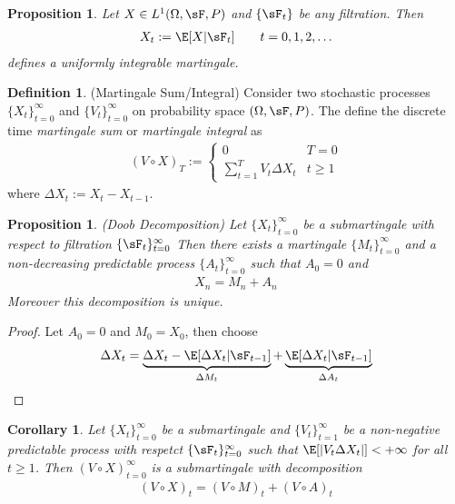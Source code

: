 \documentclass[12pt]{article}
\theoremstyle{plain}
\newtheorem{prop}[thm]{Proposition}
\newtheorem{cor}[thm]{Corollary}
\theoremstyle{definition}
\newtheorem{defn}[thm]{Definition}
\theoremstyle{remark}
\newcommand{\sumtT}{\sum^T_{t=1}}
\newcommand{\tinf}{_{t=1}^\infty}
\newcommand{\tinfz}{_{t=0}^\infty}
\begin{document}
\begin{prop}
Let $X\in L^1(\Omega,\sF,P)$ and $\{\sF_t\}$ be any filtration. Then
\begin{align*}
  X_t := \E[X|\sF_t] \qquad t=0,1,2,\ldots
\end{align*}
defines a uniformly integrable martingale.
\end{prop}


\begin{defn}(Martingale Sum/Integral)
\label{defn:martingalesum}
Consider two stochastic processes $\{X_t\}\tinfz$ and $\{V_t\}\tinfz$ on
probability space $(\Omega,\sF,P)$. The define the discrete time
\emph{martingale sum} or \emph{martingale integral} as
\begin{align*}
  (V\circ X)_T
  :=
  \begin{cases}
    0 & T = 0 \\
    \sumtT V_t \Delta X_t & t \geq 1
  \end{cases}
\end{align*}
where $\Delta X_t:= X_t - X_{t-1}$.
\end{defn}

\begin{prop}\emph{(Doob Decomposition)}
Let $\{X_t\}\tinfz$ be a submartingale with respect to filtration
$\{\sF_t\}\tinfz$ Then there exists a martingale $\{M_t\}\tinfz$ and a
non-decreasing predictable process $\{A_t\}\tinfz$ such that $A_0=0$ and
\begin{align*}
  X_n = M_n + A_n
\end{align*}
Moreover this decomposition is unique.
\end{prop}
\begin{proof}
Let $A_0=0$ and $M_0=X_0$, then choose
\begin{align*}
  \Delta X_t
  = \underbrace{\Delta X_t - \E[\Delta X_t |\sF_{t-1}]}_{\Delta M_t}
  +
  \underbrace{\E[\Delta X_t |\sF_{t-1}]}_{\Delta A_t}
\end{align*}
\end{proof}


\begin{cor}
Let $\{X_t\}\tinfz$ be a submartingale and $\{V_t\}\tinf$ be a
non-negative predictable process with respetct $\{\sF_t\}\tinfz$
such that $\E[|V_t\Delta X_t|]<+\infty$ for all $t\geq 1$. Then
$(V\circ X)\tinfz$ is a submartingale with decomposition
\begin{align*}
  (V\circ X)_t =
  (V\circ M)_t +
  (V\circ A)_t
\end{align*}
\end{cor}
\end{document}
